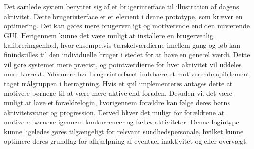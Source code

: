 Det samlede system benytter sig af et brugerinterface til illustration af dagens aktivitet. Dette brugerinterface er et element i denne prototype, som kræver en optimering. Det kan gøres mere brugervenligt og motiverende end den nuværende GUI. Herigennem kunne det være muligt at installere en brugervenlig kalibreringsenhed, hvor eksempelvis tærskelværdierne imellem gang og løb kan finindstilles til den individuelle bruger i stedet for at have en generel værdi. Dette vil gøre systemet mere præcist, og pointværdierne for hver aktivitet vil uddeles mere korrekt. Ydermere bør brugerinterfacet indebære et motiverende spilelement taget målgruppen i betragtning. Hvis et spil implementeres antages dette at motivere børnene til at være mere aktive end foruden. Desuden vil det være muligt at lave et forældrelogin, hvorigennem forældre kan følge deres børns aktivitetsvaner og progression. Derved bliver det muligt for forældrene at motivere børnene igennem konkurrencer og fælles aktiviteter. Denne logintype kunne ligeledes gøres tilgængeligt for relevant sundhedspersonale, hvilket kunne optimere deres grundlag for afhjælpning af eventuel inaktivitet og eller overvægt.

